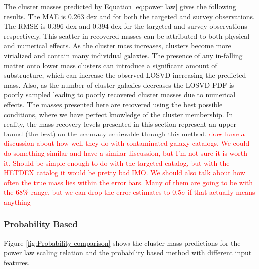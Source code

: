\documentclass[fleqn,usenatbib]{mnras}
\newcommand{\editorial}[1]{\textcolor{red}{#1}}
\begin{document}
The cluster masses predicted by Equation \ref{eq:power law} gives the following results. The MAE is 0.263 dex and for both the targeted and survey observations. The RMSE is 0.396 dex and 0.394 dex for the targeted and survey observations respectively. This scatter in recovered masses can be attributed to both physical and numerical effects. As the cluster mass increases, clusters become more virialized and contain many individual galaxies. The presence of any in-falling matter onto lower mass clusters can introduce a significant amount of substructure, which can increase the observed LOSVD increasing the predicted mass. Also, as the number of cluster galaxies decreases the LOSVD PDF is poorly sampled leading to poorly recovered cluster masses due to numerical effects. The masses presented here are recovered using the best possible conditions, where we have perfect knowledge of the cluster membership. In reality, the mass recovery levels presented in this section represent an upper bound (the best) on the accuracy achievable through this method. \editorial{\cite{Ntampaka2015} does have a discussion about how well they do with contaminated galaxy catalogs. We could do something similar and have a similar discussion, but I'm not sure it is worth it. Should be simple enough to do with the targeted catalog, but with the HETDEX catalog it would be pretty bad IMO. We should also talk about how often the true mass lies within the error bars. Many of them are going to be with the 68\% range, but we can drop the error estimates to $0.5\sigma$ if that actually means anything} 

\subsubsection{Probability Based}
Figure \ref{fig:Probability comparison} shows the cluster mass predictions for the power law scaling relation and the probability based method with different input features. 
\end{document}
